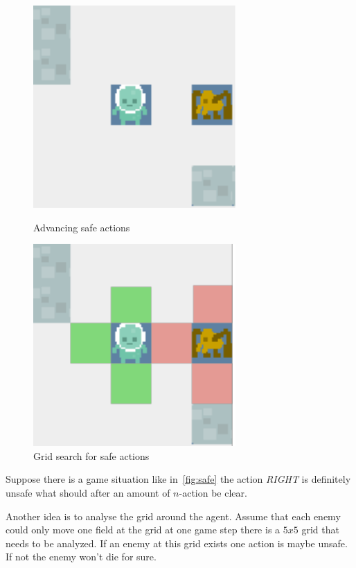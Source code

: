 \begin{figure}
\centering
\begin{minipage}{.5\textwidth}
  \centering
\includegraphics[scale=0.8]{images/safe.pdf}
\caption{Advancing safe actions}
\label{fig:safe}
\end{minipage}%
\begin{minipage}{.5\textwidth}
\centering
\includegraphics[scale=0.8]{images/safe_grid.pdf}
\caption{Grid search for safe actions}
\label{fig:safe_grid}
\end{minipage}
\end{figure}



Suppose there is a game situation like in~\cref{fig:safe} the action \textit{RIGHT} is definitely unsafe what 
should after an amount of $n$-action be clear.

Another idea is to analyse the grid around the agent. Assume that each enemy could only move one field at the grid
at one game step there is a $5x5$ grid that needs to be analyzed. If an enemy at this grid exists one action is
maybe unsafe. If not the enemy won't die for sure.




